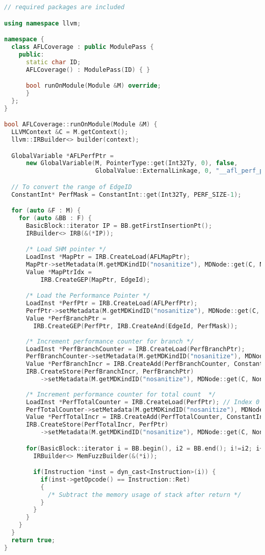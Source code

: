 \begin{lstlisting}[language=C++,style=CodeStyle,caption={Memlock C++ code for stack operations},label={lst:memlock}]
// required packages are included

using namespace llvm;

namespace {
  class AFLCoverage : public ModulePass {
    public:
      static char ID;
      AFLCoverage() : ModulePass(ID) { }

      bool runOnModule(Module &M) override;
      }
  };
}

bool AFLCoverage::runOnModule(Module &M) {
  LLVMContext &C = M.getContext();
  llvm::IRBuilder<> builder(context); 

  GlobalVariable *AFLPerfPtr =
      new GlobalVariable(M, PointerType::get(Int32Ty, 0), false,
                         GlobalValue::ExternalLinkage, 0, "__afl_perf_ptr");

  // To convert the range of EdgeID
  ConstantInt* PerfMask = ConstantInt::get(Int32Ty, PERF_SIZE-1);

  for (auto &F : M) {
    for (auto &BB : F) {
      BasicBlock::iterator IP = BB.getFirstInsertionPt();
      IRBuilder<> IRB(&(*IP));

      /* Load SHM pointer */
      LoadInst *MapPtr = IRB.CreateLoad(AFLMapPtr);
      MapPtr->setMetadata(M.getMDKindID("nosanitize"), MDNode::get(C, None));
      Value *MapPtrIdx =
          IRB.CreateGEP(MapPtr, EdgeId);

      /* Load the Performance Pointer */
      LoadInst *PerfPtr = IRB.CreateLoad(AFLPerfPtr);
      PerfPtr->setMetadata(M.getMDKindID("nosanitize"), MDNode::get(C, None));
      Value *PerfBranchPtr =
        IRB.CreateGEP(PerfPtr, IRB.CreateAnd(EdgeId, PerfMask));
  
      /* Increment performance counter for branch */
      LoadInst *PerfBranchCounter = IRB.CreateLoad(PerfBranchPtr);
      PerfBranchCounter->setMetadata(M.getMDKindID("nosanitize"), MDNode::get(C, None));
      Value *PerfBranchIncr = IRB.CreateAdd(PerfBranchCounter, ConstantInt::get(Int32Ty, 1));
      IRB.CreateStore(PerfBranchIncr, PerfBranchPtr)
          ->setMetadata(M.getMDKindID("nosanitize"), MDNode::get(C, None));
      
      /* Increment performance counter for total count  */
      LoadInst *PerfTotalCounter = IRB.CreateLoad(PerfPtr); // Index 0 of the perf map
      PerfTotalCounter->setMetadata(M.getMDKindID("nosanitize"), MDNode::get(C, None));
      Value *PerfTotalIncr = IRB.CreateAdd(PerfTotalCounter, ConstantInt::get(Int32Ty, 1));
      IRB.CreateStore(PerfTotalIncr, PerfPtr)
          ->setMetadata(M.getMDKindID("nosanitize"), MDNode::get(C, None));

      for(BasicBlock::iterator i = BB.begin(), i2 = BB.end(); i!=i2; i++) {
        IRBuilder<> MemFuzzBuilder(&(*i));

        if(Instruction *inst = dyn_cast<Instruction>(i)) {
          if(inst->getOpcode() == Instruction::Ret)
          {
            /* Subtract the memory usage of stack after return */ 
          }
        }
      }
    }
  }
  return true;
}
\end{lstlisting}